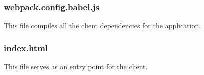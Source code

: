 \subsubsection{webpack.config.babel.js} %
This file compiles all the client dependencies for the application.


\subsubsection{index.html} %
This file serves as an entry point for the client.

